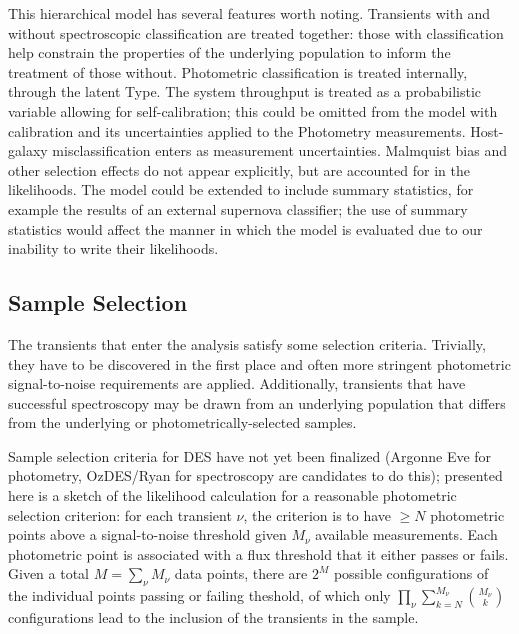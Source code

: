 \documentclass[preprint,3p]{elsarticle}
\begin{document}
This hierarchical model has several features worth noting.  Transients with and without
spectroscopic classification are treated together: those with classification help constrain
the properties of the underlying population to inform the treatment of those without.
Photometric classification is treated internally, through the
latent Type.  The system throughput is treated as a probabilistic variable
allowing for self-calibration; this could be omitted from the model with calibration
and its uncertainties applied
to the Photometry measurements.  Host-galaxy misclassification enters as measurement
uncertainties.  Malmquist bias and other selection effects do not appear explicitly, but are accounted
for in the likelihoods.  The model could be extended to include summary statistics,
for example the results of an external supernova classifier; the use
of summary statistics would affect the manner in which the model is evaluated
due to our inability to write their likelihoods.

\subsection{Sample Selection}
The transients that enter the analysis satisfy some selection criteria.  Trivially, they
have to be discovered in the first place and often more stringent photometric signal-to-noise
requirements are applied.  Additionally, transients that have
successful spectroscopy may be drawn from an underlying population that differs from the
underlying or photometrically-selected samples.

Sample selection criteria for DES have not yet been finalized
(Argonne Eve for photometry, OzDES/Ryan for spectroscopy are candidates to do this);
presented here is a sketch of the likelihood calculation for a reasonable
photometric selection criterion:
for each transient $\nu$, the criterion is to have $\ge N$ photometric points
above a signal-to-noise threshold given $M_\nu$ available measurements.
Each photometric point is associated with a flux threshold that it either passes
or fails.  Given a total $M=\sum_\nu M_\nu$ data points, there are
$2^M$ possible configurations
of the individual points passing or failing theshold, of which only
$\prod_\nu \sum_{k=N}^{M_{\nu}} \binom{M_{\nu}}{k}$  configurations lead to
the inclusion of the transients in the sample.
\end{document}
